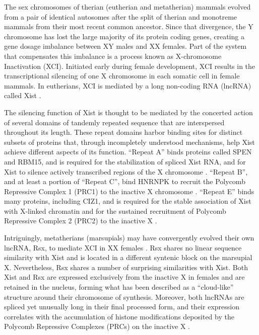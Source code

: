 The sex chromosomes of therian (eutherian and metatherian) mammals evolved from a pair of identical autosomes after the split of therian and monotreme mammals from their most recent common ancestor. Since that divergence, the Y chromosome has lost the large majority of its protein coding genes, creating a gene dosage imbalance between XY males and XX females. Part of the system that compensates this imbalance is a process known as X-chromosome Inactivation (XCI). Initiated early during female development, XCI results in the transcriptional silencing of one X chromosome in each somatic cell in female mammals. In eutherians, XCI is mediated by a long non-coding RNA (lncRNA) called Xist \cite{Balaton2018TheChromosome,Brockdorff2018LocalNcRNA,DaRocha2017NovelConformation,Sahakyan2018TheCompensation}. 

The silencing function of Xist is thought to be mediated by the concerted action of several domains of tandemly repeated sequence that are interspersed throughout its length. These repeat domains harbor binding sites for distinct subsets of proteins that, through incompletely understood mechanisms, help Xist achieve different aspects of its function. “Repeat A” binds proteins called SPEN and RBM15, and is required for the stabilization of spliced Xist RNA, and for Xist to silence actively transcribed regions of the X chromosome \cite{Chu2015SystematicProteins,Engreitz2013TheChromosome, Hoki2009AMouse,McHugh2015TheHDAC3, Moindrot2015ASilencing, Patil2016M6Repression,Royce-Tolland2010TheInactivation,Wutz2002ChromosomalRNA}. “Repeat B”, and at least a portion of “Repeat C”, bind HNRNPK to recruit the Polycomb Repressive Complex 1 (PRC1) to the inactive X chromosome \cite{Almeida2017PCGF3/5-PRC1Inactivation,Pintacuda2017HnRNPKSilencing}. “Repeat E” binds many proteins, including CIZ1, and is required for the stable association of Xist with X-linked chromatin and for the sustained recruitment of Polycomb Repressive Complex 2 (PRC2) to the inactive X  \cite{Ridings-Figueroa2017TheTerritory,Smola2016SHAPECells,Sunwoo2017RepeatCIZ1}.

Intriguingly, metatherians (marsupials) may have convergently evolved their own lncRNA, Rsx, to mediate XCI in XX females \cite{Grant2012RsxInactivation}. Rsx shares no linear sequence similarity with Xist and is located in a different syntenic block on the marsupial X. Nevertheless, Rsx shares a number of surprising similarities with Xist. Both Xist and Rsx are expressed exclusively from the inactive X in females and are retained in the nucleus, forming what has been described as a “cloud-like” structure around their chromosome of synthesis. Moreover, both lncRNAs are spliced yet unusually long in their final processed form, and their expression correlates with the accumulation of histone modifications deposited by the Polycomb Repressive Complexes (PRCs) on the inactive X \cite{Grant2012RsxInactivation,Wang2011AExpression}. 

